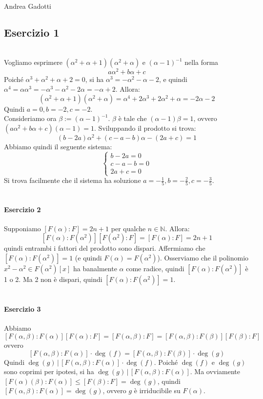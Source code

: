 \documentclass[12pt,a4paper]{report}
\theoremstyle{definition}
\begin{document}
\noindent Andrea Gadotti

\subsection*{Esercizio 1}\ \\
Vogliamo esprimere $(\alpha^2+\alpha+1)(\alpha^2+\alpha)$ e $(\alpha-1)^{-1}$ nella forma
$$a \alpha^2 + b \alpha +c$$
Poiché $\alpha^3+\alpha^2+\alpha+2=0$, si ha $\alpha^3=-\alpha^2-\alpha-2$, e quindi $\alpha^4=\alpha \alpha^3=-\alpha^3-\alpha^2-2\alpha=-\alpha+2$. Allora:
$$(\alpha^2+\alpha+1)(\alpha^2+\alpha)=\alpha^4+2\alpha^3+2\alpha^2+\alpha=-2\alpha-2$$
Quindi $a=0, b=-2, c=-2$.\\
Consideriamo ora $\beta:=(\alpha-1)^{-1}$. $\beta$ è tale che $(\alpha-1)\beta=1$, ovvero $(a \alpha^2 + b \alpha +c)(\alpha-1)=1$. Sviluppando il prodotto si trova:
$$(b-2a)\alpha^2+(c-a-b)\alpha-(2a+c)=1$$
Abbiamo quindi il seguente sistema:
$$\left\{
\begin{array}{l}
b-2a=0 \\
c-a-b=0 \\
2a+c=0 
\end{array}
\right.
$$
Si trova facilmente che il sistema ha soluzione $a=-\frac{1}{5}, b=-\frac{2}{5}, c=-\frac{3}{5}$.
\\
\\
\\
\noindent\textbf{Esercizio 2}\\
\\
Supponiamo $[F(\alpha):F]=2n+1$ per qualche $n \in \mathbb{N}$. Allora:
$$[F(\alpha):F(\alpha^2)][F(\alpha^2):F]=[F(\alpha):F]=2n+1$$
quindi entrambi i fattori del prodotto sono dispari. Affermiamo che $[F(\alpha):F(\alpha^2)]=1$ (e quindi $F(\alpha)=F(\alpha^2)$). Osserviamo che il polinomio $x^2-\alpha^2 \in F(\alpha^2)[x]$ ha banalmente $\alpha$ come radice, quindi $[F(\alpha):F(\alpha^2)]$ è 1 o 2. Ma 2 non è dispari, quindi $[F(\alpha):F(\alpha^2)]=1$.
\\
\\
\\
\noindent\textbf{Esercizio 3}\\
\\
Abbiamo
$$[F(\alpha, \beta):F(\alpha)][F(\alpha):F]=[F(\alpha, \beta):F]=[F(\alpha, \beta):F(\beta)][F(\beta):F]$$
ovvero
$$[F(\alpha, \beta):F(\alpha)] \cdot \deg(f)=[F(\alpha, \beta):F(\beta)] \cdot \deg(g)$$
Quindi $\deg(g) \, | \, [F(\alpha, \beta):F(\alpha)] \cdot \deg(f)$. Poiché $\deg(f)$ e $\deg(g)$ sono coprimi per ipotesi, si ha $\deg(g) \, | \, [F(\alpha, \beta):F(\alpha)]$. Ma ovviamente $[F(\alpha)(\beta):F(\alpha)] \leq [F(\beta):F]=\deg(g)$, quindi $[F(\alpha, \beta):F(\alpha)]=\deg(g)$, ovvero $g$ è irriducibile su $F(\alpha)$.
\end{document}
